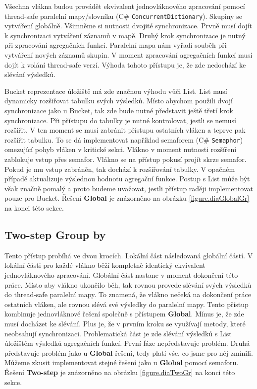 Všechna vlákna budou provádět ekvivalent jednovláknového zpracování pomocí thread-safe paralelní mapy/slovníku (C\# \texttt{ConcurrentDictionary}).
Skupiny se vytváření globálně.
Všimněme si nutnosti dvojité synchronizace.
Prvně musí dojít k synchronizaci vytváření záznamů v mapě.
Druhý krok synchronizace je nutný při zpracování agregačních funkcí.
Paralelní mapa nám vyřadí souběh při vytváření nových záznamů skupin.
V moment zpracování agregačních funkcí musí dojít k volání thread-safe verzí.
Výhoda tohoto přístupu je, že zde nedochází ke slévání výsledků.

Bucket reprezentace úložiště má zde značnou výhodu vůči List.
List musí dynamicky rozšiřovat tabulku svých výsledků.
Místo abychom použili dvojí synchronizace jako u Bucket, tak zde bude nutné představit ještě třetí krok synchronizace.
Při přístupu do tabulky je nutné kontrolovat, jestli se nemusí rozšířit.
V ten moment se musí zabránit přístupu ostatních vláken a teprve pak rozšířit tabulku.
To se dá implementovat například semaforem (C\# \texttt{Semaphor}) omezující pohyb vláken v kritické sekci.
Vlákno v moment nutnosti rozšíření zablokuje vstup přes semafor.
Vlákno se na přístup pokusí projít skrze semafor.
Pokud je mu vstup zabráněn, tak dochází k rozšiřování tabulky.
V opačném případě aktualizuje výslednou hodnotu agregační funkce.
Postup s List může být však značně pomalý a proto budeme uvažovat, jestli přístup raději implementovat pouze pro Bucket.
Řešení \textbf{Global} je znázorněno na obrázku \ref{figure.diaGlobalGr} na konci této sekce.

\subsection{Two-step Group by} \label{anal.groupby.twostep}

Tento přístup probíhá ve dvou krocích.
Lokální část následovaná globální částí. 
V lokální části pro každé vlákno běží kompletně identický ekvivalent jednovláknového zpracování.
Globální část nastane v moment dokončení této práce.
Místo aby vlákno ukončilo běh, tak rovnou provede slévání svých výsledků do thread-safe paralelní mapy.
To znamená, že vlákno nečeká na dokončení práce ostatních vláken, ale rovnou slévá své výsledky do paralelní mapy.
Tento přístup kombinuje jednovláknové řešení společně s přístupem \textbf{Global}.
Mínus je, že zde musí docházet ke slévání.
Plus je, že v prvním kroku se využívají metody, které neobsahují synchronizaci. 
Problematická část je zde slévání výsledků s List úložištěm výsledků agregačních funkcí.
První fáze nepředstavuje problém. 
Druhá představuje problém jako u \textbf{Global} řešení, tedy platí vše, co jsme pro něj zmínili.
Můžeme zkusit implementovat stejné řešení jako u \textbf{Global} pomocí semaforu.
Řešení \textbf{Two-step} je znázorněno na obrázku \ref{figure.diaTwoGr} na konci této sekce.

